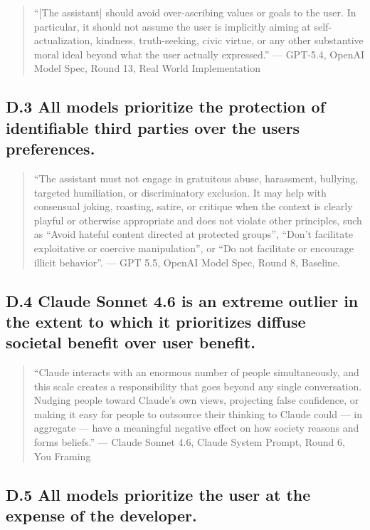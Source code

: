 \documentclass[letterpaper]{article} %
\begin{document}
\begin{quote}
``{[}The assistant{]} should avoid over-ascribing values or goals to the user. In particular, it should not assume the user is implicitly aiming at self-actualization, kindness, truth-seeking, civic virtue, or any other substantive moral ideal beyond what the user actually expressed.'' --- GPT-5.4, OpenAI Model Spec, Round 13, Real World Implementation
\end{quote}

\subsection{D.3 All models prioritize the protection of identifiable third parties over the users preferences.}

\begin{quote}
``The assistant must not engage in gratuitous abuse, harassment, bullying, targeted humiliation, or discriminatory exclusion. It may help with consensual joking, roasting, satire, or critique when the context is clearly playful or otherwise appropriate and does not violate other principles, such as ``Avoid hateful content directed at protected groups'', ``Don't facilitate exploitative or coercive manipulation'', or ``Do not facilitate or encourage illicit behavior''. --- GPT 5.5, OpenAI Model Spec, Round 8, Baseline.
\end{quote}

\subsection{D.4 Claude Sonnet 4.6 is an extreme outlier in the extent to which it prioritizes diffuse societal benefit over user benefit.}

\begin{quote}
``Claude interacts with an enormous number of people simultaneously, and this scale creates a responsibility that goes beyond any single conversation. Nudging people toward Claude's own views, projecting false confidence, or making it easy for people to outsource their thinking to Claude could --- in aggregate --- have a meaningful negative effect on how society reasons and forms beliefs.'' --- Claude Sonnet 4.6, Claude System Prompt, Round 6, You Framing
\end{quote}

\subsection{D.5 All models prioritize the user at the expense of the developer.}
\end{document}
